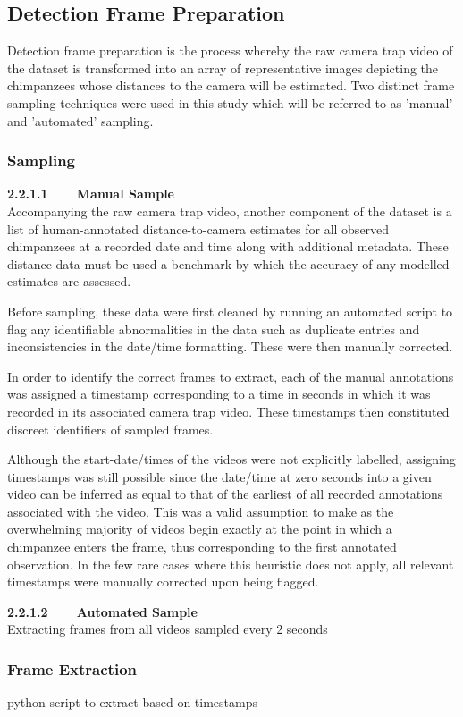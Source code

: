 \subsection{Detection Frame Preparation}

Detection frame preparation is the process whereby the raw camera trap video of the dataset
is transformed into an array of representative images depicting the chimpanzees whose
distances to the camera will be estimated.
Two distinct frame sampling techniques were used in this study which will be referred to as
'manual' and 'automated' sampling.

\vspace{-3mm}

\subsubsection{Sampling}

\textbf{2.2.1.1~~~~Manual Sample}\vspace{4.5mm}\\
Accompanying the raw camera trap video, another component of the dataset is a list of
human-annotated distance-to-camera estimates for all observed chimpanzees at a recorded
date and time along with additional metadata.
These distance data must be used a benchmark by which the accuracy of any modelled estimates
are assessed.

Before sampling, these data were first cleaned by running an automated script to flag any
identifiable abnormalities in the data such as duplicate entries and inconsistencies in the
date/time formatting.
These were then manually corrected.

In order to identify the correct frames to extract, each of the manual annotations was assigned
a timestamp corresponding to a time in seconds in which it was recorded in its associated camera
trap video.
These timestamps then constituted discreet identifiers of sampled frames.

Although the start-date/times of the videos were not explicitly labelled, assigning timestamps was
still possible since the date/time at zero seconds into a given video can be inferred as equal
to that of the earliest of all recorded annotations associated with the video.
This was a valid assumption to make as the overwhelming majority of videos begin exactly at the
point in which a chimpanzee enters the frame, thus corresponding to the first annotated observation.
In the few rare cases where this heuristic does not apply, all relevant timestamps were manually
corrected upon being flagged.

\vspace{3mm}

\textbf{2.2.1.2~~~~Automated Sample}\vspace{4.5mm}\\
Extracting frames from all videos sampled every 2 seconds

\vspace{-2.5mm}

\subsubsection{Frame Extraction}
python script to extract based on timestamps